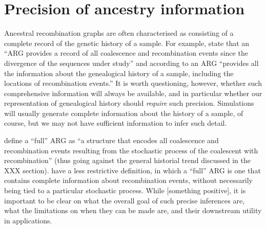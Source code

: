\documentclass{article}
\begin{document}


\section*{Precision of ancestry information}
Ancestral recombination graphs are often characterised
as consisting of a complete record of the genetic history
of a sample. For example,
\cite{rasmussen2014genome} state that an ``ARG provides a record of all
coalescence and recombination events since the divergence of the sequences
under study'' and
according to \cite{deng2021distribution} an ARG
``provides all the information about the genealogical history of a sample,
including the locations of recombination events.'' It is worth
questioning, however, whether such comprehensive information
will always be available, and in particular whether our
representation of genealogical history should \emph{require}
such precision. Simulations will usually generate complete
information about the history of a sample, of course, but
we may not have sufficient information to infer such detail.

\citet{brandt2021evaluation} define a ``full'' ARG as
``a structure that encodes all
coalescence and recombination events resulting from the stochastic process of
the coalescent with recombination'' (thus going against the general
historial trend discussed in the XXX section).
\citet{rasmussen2022espalier} have a less restrictive definition, in
which a ``full'' ARG is one that contains complete information about
recombination events, without necessarily being tied to a particular
stochastic process.
While [something positive], it is important to be clear on
what the overall goal of such precise inferences are,
what the limitations on when they can be made are,
and their downstream utility in applications.
\end{document}
